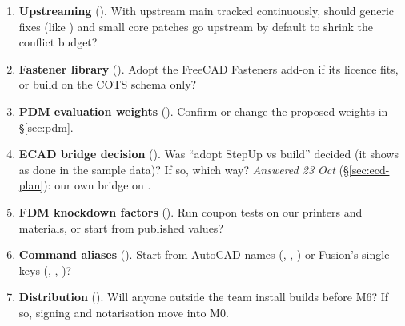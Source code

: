 \begin{enumerate}[label=Q\arabic*.,ref=Q\arabic*]
        \emph{Answered 22 Oct} (\S\ref{sec:joints}): instances stay free; a joint on an instance wins over the
        pattern, and the conflict is reported.
  \item \textbf{Upstreaming} (). With upstream main tracked continuously, should generic fixes
        (like ) and small core patches go upstream by default to shrink the conflict budget?
  \item \textbf{Fastener library} (). Adopt the FreeCAD Fasteners add-on if its licence fits, or
        build on the COTS schema only?
  \item \textbf{PDM evaluation weights} (). Confirm or change the proposed weights in
        \S\ref{sec:pdm}.
  \item \textbf{ECAD bridge decision} (). Was ``adopt StepUp vs build'' decided (it shows as done in the
        sample data)? If so, which way?
        \emph{Answered 23 Oct} (\S\ref{sec:ecd-plan}): our own bridge on .
  \item \textbf{FDM knockdown factors} (). Run coupon tests on our printers and materials, or start
        from published values?
  \item \textbf{Command aliases} (). Start from AutoCAD names (, , ) or
        Fusion's single keys (, , )?
  \item \textbf{Distribution} (). Will anyone outside the team install builds before M6? If so,
        signing and notarisation move into M0.
\end{enumerate}
